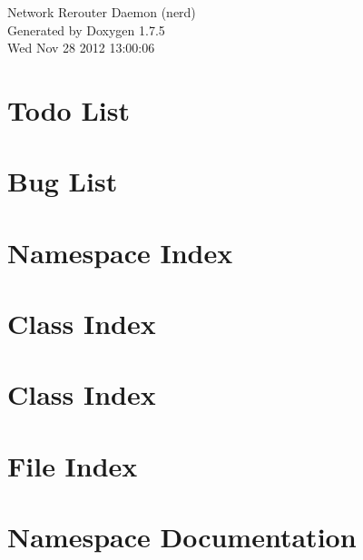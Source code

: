 \documentclass[a4paper]{book}
\begin{document}
\hypersetup{pageanchor=false,citecolor=blue}
\begin{titlepage}
\vspace*{7cm}
\begin{center}
{\Large \-Network \-Rerouter \-Daemon (nerd) }\\
\vspace*{1cm}
{\large \-Generated by Doxygen 1.7.5}\\
\vspace*{0.5cm}
{\small Wed Nov 28 2012 13:00:06}\\
\end{center}
\end{titlepage}
\clearemptydoublepage
{}
\tableofcontents
\clearemptydoublepage
{}
\hypersetup{pageanchor=true,citecolor=blue}
\chapter{\-Todo \-List}
\label{todo}
\hypertarget{todo}{}

\chapter{\-Bug \-List}
\label{bug}
\hypertarget{bug}{}

\chapter{\-Namespace \-Index}

\chapter{\-Class \-Index}

\chapter{\-Class \-Index}

\chapter{\-File \-Index}

\chapter{\-Namespace \-Documentation}



\end{document}
